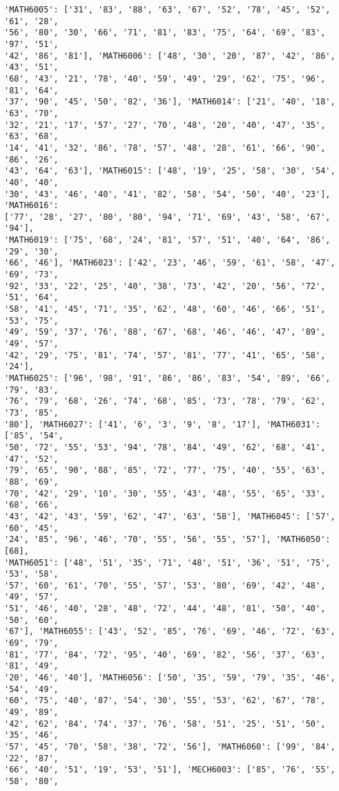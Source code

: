 \documentclass[11pt]{article}
\begin{document}
\begin{Verbatim}[commandchars=\\\{\}]
'MATH6005': ['31', '83', '88', '63', '67', '52', '78', '45', '52', '61', '28',
'56', '80', '30', '66', '71', '81', '83', '75', '64', '69', '83', '97', '51',
'42', '86', '81'], 'MATH6006': ['48', '30', '20', '87', '42', '86', '43', '51',
'68', '43', '21', '78', '40', '59', '49', '29', '62', '75', '96', '81', '64',
'37', '90', '45', '50', '82', '36'], 'MATH6014': ['21', '40', '18', '63', '70',
'32', '21', '17', '57', '27', '70', '48', '20', '40', '47', '35', '63', '68',
'14', '41', '32', '86', '78', '57', '48', '28', '61', '66', '90', '86', '26',
'43', '64', '63'], 'MATH6015': ['48', '19', '25', '58', '30', '54', '40', '40',
'30', '43', '46', '40', '41', '82', '58', '54', '50', '40', '23'], 'MATH6016':
['77', '28', '27', '80', '80', '94', '71', '69', '43', '58', '67', '94'],
'MATH6019': ['75', '68', '24', '81', '57', '51', '40', '64', '86', '29', '30',
'66', '46'], 'MATH6023': ['42', '23', '46', '59', '61', '58', '47', '69', '73',
'92', '33', '22', '25', '40', '38', '73', '42', '20', '56', '72', '51', '64',
'58', '41', '45', '71', '35', '62', '48', '60', '46', '66', '51', '53', '75',
'49', '59', '37', '76', '88', '67', '68', '46', '46', '47', '89', '49', '57',
'42', '29', '75', '81', '74', '57', '81', '77', '41', '65', '58', '24'],
'MATH6025': ['96', '98', '91', '86', '86', '83', '54', '89', '66', '79', '83',
'76', '79', '68', '26', '74', '68', '85', '73', '78', '79', '62', '73', '85',
'80'], 'MATH6027': ['41', '6', '3', '9', '8', '17'], 'MATH6031': ['85', '54',
'50', '72', '55', '53', '94', '78', '84', '49', '62', '68', '41', '47', '52',
'79', '65', '90', '88', '85', '72', '77', '75', '40', '55', '63', '88', '69',
'70', '42', '29', '10', '30', '55', '43', '48', '55', '65', '33', '68', '66',
'43', '42', '43', '59', '62', '47', '63', '58'], 'MATH6045': ['57', '60', '45',
'24', '85', '96', '46', '70', '55', '56', '55', '57'], 'MATH6050': [68],
'MATH6051': ['48', '51', '35', '71', '48', '51', '36', '51', '75', '53', '58',
'57', '60', '61', '70', '55', '57', '53', '80', '69', '42', '48', '49', '57',
'51', '46', '40', '28', '48', '72', '44', '48', '81', '50', '40', '50', '60',
'67'], 'MATH6055': ['43', '52', '85', '76', '69', '46', '72', '63', '69', '79',
'81', '77', '84', '72', '95', '40', '69', '82', '56', '37', '63', '81', '49',
'20', '46', '40'], 'MATH6056': ['50', '35', '59', '79', '35', '46', '54', '49',
'60', '75', '40', '87', '54', '30', '55', '53', '62', '67', '78', '49', '89',
'42', '62', '84', '74', '37', '76', '58', '51', '25', '51', '50', '35', '46',
'57', '45', '70', '58', '38', '72', '56'], 'MATH6060': ['99', '84', '22', '87',
'66', '40', '51', '19', '53', '51'], 'MECH6003': ['85', '76', '55', '58', '80',

\end{Verbatim}
\end{document}
